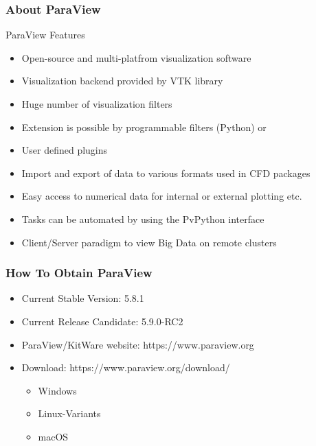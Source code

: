 \begin{frame}
	\frametitle{About ParaView}

      \begin{block}{ParaView Features}
        \begin{itemize}
		\item Open-source and multi-platfrom visualization software
		\item Visualization backend provided by VTK library
		\item Huge number of visualization filters  
                \item Extension is possible by programmable filters (Python) or 
                \item User defined plugins  
		\item Import and export of data to various formats used in CFD packages
		\item Easy access to numerical data for internal or external plotting etc.
		\item Tasks can be automated by using the PvPython interface
		\item Client/Server paradigm to view Big Data on remote clusters
        \end{itemize}
      \end{block}

\end{frame}

\begin{frame}
  \frametitle{How To Obtain ParaView}
    \begin{itemize}
      \item Current Stable Version: 5.8.1
      \item Current Release Candidate: 5.9.0-RC2			
      \item ParaView/KitWare website: https://www.paraview.org
			\item Download: https://www.paraview.org/download/
      \begin{itemize}			
				\item Windows
				\item Linux-Variants
				\item macOS
      \end{itemize}			
    \end{itemize}
\end{frame}

